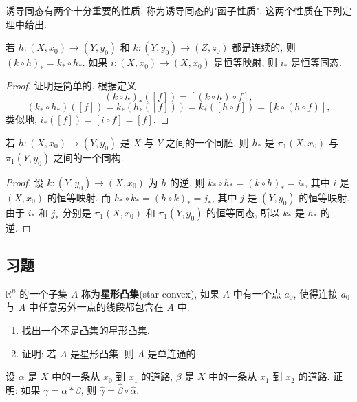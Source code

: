 诱导同态有两个十分重要的性质, 称为诱导同态的"函子性质". 这两个性质在下列定理中给出.

\begin{theorem}
\label{theorem:ch09-sec52-52-4}
若 $h\colon(X,x_0)\to(Y,y_0)$ 和 $k\colon(Y,y_0)\to(Z,z_0)$ 都是连续的, 则 $(k\circ h)_*=k_*\circ h_*$. 如果 $i\colon(X,x_0)\to(X,x_0)$ 是恒等映射, 则 $i_*$ 是恒等同态.
\end{theorem}

\begin{proof}
证明是简单的. 根据定义
\[
(k\circ h)_{*}([f])=[(k\circ h)\circ f],
\]
\[
(k_{*}\circ h_{*})([f])=k_{*}(h_{*}([f]))=k_{*}([h\circ f])=[k\circ(h\circ f)],
\]
类似地, $i_*([f])=[i\circ f]=[f]$.
\end{proof}

\begin{corollary}
\label{corollary:ch09-sec52-52-5}
若 $h\colon(X,x_0)\to(Y,y_0)$ 是 $X$ 与 $Y$ 之间的一个同胚, 则 $h_*$ 是 $\pi_1(X,x_0)$ 与 $\pi_1(Y,y_0)$ 之间的一个同构.
\end{corollary}

\begin{proof}
设 $k\colon(Y,y_0)\to(X,x_0)$ 为 $h$ 的逆, 则 $k_*\circ h_*=(k\circ h)_*=i_*$, 其中 $i$ 是 $(X,x_0)$ 的恒等映射. 而 $h_*\circ k_*=(h\circ k)_*=j_*$, 其中 $j$ 是 $(Y,y_0)$ 的恒等映射. 由于 $i_*$ 和 $j_*$ 分别是 $\pi_1(X,x_0)$ 和 $\pi_1(Y,y_0)$ 的恒等同态, 所以 $k_*$ 是 $h_*$ 的逆.
\end{proof}

\subsection*{习题}

\begin{exercise}
$\mathbb{R}^{n}$ 的一个子集 $A$ 称为\textbf{星形凸集}(star convex), 如果 $A$ 中有一个点 $a_0$, 使得连接 $a_0$ 与 $A$ 中任意另外一点的线段都包含在 $A$ 中.
\begin{enumerate}
\item 找出一个不是凸集的星形凸集.
\item 证明: 若 $A$ 是星形凸集, 则 $A$ 是单连通的.
\end{enumerate}
\end{exercise}

\begin{exercise}
设 $\alpha$ 是 $X$ 中的一条从 $x_0$ 到 $x_1$ 的道路, $\beta$ 是 $X$ 中的一条从 $x_1$ 到 $x_2$ 的道路. 证明: 如果 $\gamma=\alpha*\beta$, 则 $\hat{\gamma}=\hat{\beta}\circ\hat{\alpha}$.
\end{exercise}

